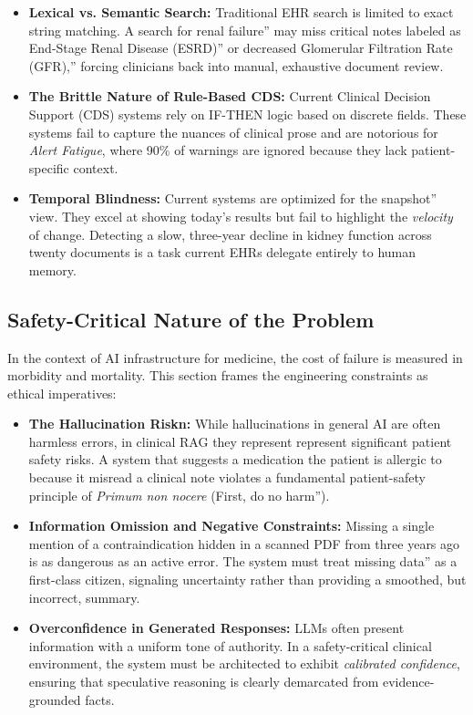 \begin{itemize} \item \textbf{Lexical vs. Semantic Search:} Traditional EHR search is limited to exact string matching. A search for renal failure'' may miss critical notes labeled as End-Stage Renal Disease (ESRD)'' or decreased Glomerular Filtration Rate (GFR),'' forcing clinicians back into manual, exhaustive document review. \item \textbf{The Brittle Nature of Rule-Based CDS:} Current Clinical Decision Support (CDS) systems rely on IF-THEN logic based on discrete fields. These systems fail to capture the nuances of clinical prose and are notorious for \textit{Alert Fatigue}, where 90\% of warnings are ignored because they lack patient-specific context. \item \textbf{Temporal Blindness:} Current systems are optimized for the snapshot'' view. They excel at showing today's results but fail to highlight the \textit{velocity} of change. Detecting a slow, three-year decline in kidney function across twenty documents is a task current EHRs delegate entirely to human memory. \end{itemize}

\subsection{Safety-Critical Nature of the Problem} In the context of AI infrastructure for medicine, the cost of failure is measured in morbidity and mortality. This section frames the engineering constraints as ethical imperatives:
\begin{itemize}

    \item \textbf{The Hallucination Riskn:} While hallucinations in general AI are often harmless errors, in clinical RAG they represent represent significant patient safety risks. A system that suggests a medication the patient is allergic to because it misread a clinical note violates a fundamental patient-safety principle of \textit{Primum non nocere} (First, do no harm''). 

\item \textbf{Information Omission and Negative Constraints:} Missing a single mention of a contraindication hidden in a scanned PDF from three years ago is as dangerous as an active error. The system must treat missing data'' as a first-class citizen, signaling uncertainty rather than providing a smoothed, but incorrect, summary. \item \textbf{Overconfidence in Generated Responses:} LLMs often present information with a uniform tone of authority. In a safety-critical clinical environment, the system must be architected to exhibit \textit{calibrated confidence}, ensuring that speculative reasoning is clearly demarcated from evidence-grounded facts. \end{itemize}




